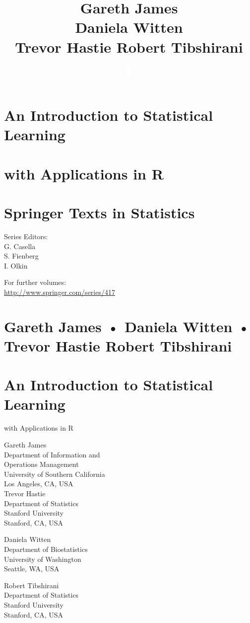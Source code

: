 \documentclass[10pt]{article}
\title{Gareth James \\
 Daniela Witten \\
 Trevor Hastie Robert Tibshirani }
\author{\includegraphics[max width=\textwidth]{2025_05_05_efe77898333945044de4g-318(1)}
}
\date{}
\begin{document}
\maketitle
\section*{An Introduction to Statistical Learning }
\section*{with Applications in R}
\section*{Springer Texts in Statistics}
Series Editors:\\
G. Casella\\
S. Fienberg\\
I. Olkin

For further volumes:\\
\href{http://www.springer.com/series/417}{http://www.springer.com/series/417}

\section*{Gareth James • Daniela Witten • Trevor Hastie Robert Tibshirani }
\section*{An Introduction to Statistical Learning }
with Applications in R

Gareth James\\
Department of Information and\\
Operations Management\\
University of Southern California\\
Los Angeles, CA, USA\\
Trevor Hastie\\
Department of Statistics\\
Stanford University\\
Stanford, CA, USA

Daniela Witten\\
Department of Biostatistics\\
University of Washington\\
Seattle, WA, USA

Robert Tibshirani\\
Department of Statistics\\
Stanford University\\
Stanford, CA, USA
\end{document}
